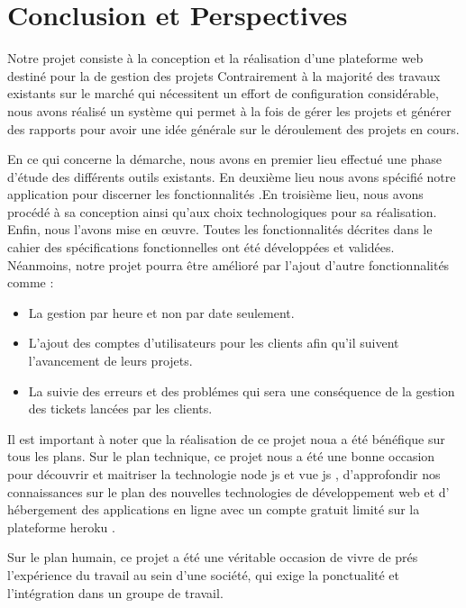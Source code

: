 
\chapter*{Conclusion et Perspectives}

Notre projet  consiste \`{a} la conception et la r\'{e}alisation d'une plateforme web destin\'{e} pour la de gestion des projets
Contrairement \`{a} la majorit\'{e} des travaux existants sur le march\'{e} qui n\'{e}cessitent un effort de configuration consid\'{e}rable, nous avons r\'{e}alis\'{e} un syst\`{e}me qui permet \`{a} la fois de g\'{e}rer les projets et g\'{e}n\'{e}rer des rapports pour avoir une id\'{e}e g\'{e}n\'{e}rale sur le d\'{e}roulement des projets en cours.

En ce qui concerne la d\'{e}marche, nous avons en premier lieu effectu\'{e} une phase d'\'{e}tude des diff\'{e}rents outils existants. En deuxi\`{e}me lieu nous avons sp\'{e}cifi\'{e} notre application pour discerner les fonctionnalit\'{e}s .En troisi\`{e}me lieu, nous avons proc\'{e}d\'{e} \`{a} sa conception ainsi qu'aux choix technologiques pour sa r\'{e}alisation. Enfin, nous l'avons mise en \oe{}uvre.
Toutes les fonctionnalit\'{e}s d\'{e}crites dans le cahier des sp\'{e}cifications fonctionnelles ont \'{e}t\'{e} d\'{e}velopp\'{e}es et valid\'{e}es. N\'{e}anmoins, notre projet pourra \^{e}tre am\'{e}lior\'{e} par l'ajout d'autre
fonctionnalit\'{e}s comme :

\begin{itemize}
\item{ La gestion par heure et non par date seulement.}
\item{ L'ajout des comptes d'utilisateurs pour les clients afin qu'il suivent l'avancement de leurs projets.}
\item{ La suivie des erreurs et des probl\'{e}mes qui sera une  cons\'{e}quence de la gestion des tickets lanc\'{e}es par les clients.  }
\end{itemize}


Il est important \`{a} noter que la r\'{e}alisation de ce projet noua a \'{e}t\'{e} b\'{e}n\'{e}fique sur tous les plans.
Sur le plan technique, ce projet nous a \'{e}t\'{e} une bonne occasion pour d\'{e}couvrir et maitriser la technologie node js et vue js ,
d'approfondir nos connaissances sur le plan des nouvelles technologies de d\'{e}veloppement web et
d' h\'{e}bergement des applications en ligne avec un compte gratuit limit\'{e} sur la plateforme \guillemotleft{} heroku \guillemotright{}.

Sur le plan humain, ce projet a \'{e}t\'{e} une v\'{e}ritable occasion de vivre de pr\'{e}s l'exp\'{e}rience du travail au sein d'une soci\'{e}t\'{e}, qui exige la ponctualit\'{e} et l'int\'{e}gration dans un groupe de travail.

